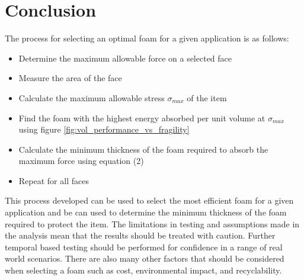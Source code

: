 \documentclass{article}
\begin{document}
\section{Conclusion}

The process for selecting an optimal foam for a given application is as follows:
\begin{itemize}
    \item Determine the maximum allowable force on a selected face
    \item Measure the area of the face
    \item Calculate the maximum allowable stress $\sigma_{max}$ of the item
    \item Find the foam with the highest energy absorbed per unit volume at $\sigma_{max}$ using figure \ref{fig:vol_performance_vs_fragility}
    \item Calculate the minimum thickness of the foam required to absorb the maximum force using equation (2)
    \item Repeat for all faces
\end{itemize}

This process developed can be used to select the most efficient foam for a given application and
be can used to determine the minimum thickness of the foam required to protect the item.
The limitations in testing and assumptions made in the analysis mean that the results should be treated with caution.
Further temporal based testing should be performed for confidence in a range of real world scenarios.
There are also many other factors that should be considered when selecting a foam such as cost, environmental impact, and recyclability.
\end{document}
